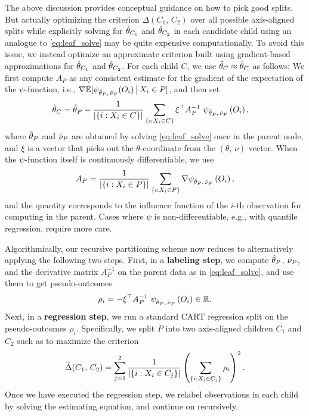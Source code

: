 \documentclass[aos]{imsart}
\theoremstyle{plain}
\theoremstyle{definition}
\theoremstyle{remark}
\begin{document}
\begin{CJK}{UTF8}{gbsn}
The above discussion provides conceptual guidance on how to pick
good splits. But actually optimizing the
criterion $\Delta(C_1, \, C_2)$ over all possible axis-aligned splits
while explicitly solving for $\hat{\theta}_{C_1}$ and $\hat{\theta}_{C_2}$ in each candidate child
using an analogue to \eqref{eq:leaf_solve} may be quite expensive computationally.
To avoid this issue, we instead optimize an approximate criterion 
built using gradient-based approximations for $\hat{\theta}_{C_1}$ and $\hat{\theta}_{C_2}$.
For each child $C$, we use $\tilde{\theta}_C \approx \hat{\theta}_C$ as follows:
We first compute $A_P$ as any consistent estimate for the gradient of the expectation of the $\psi$-function, i.e.,
$\nabla \mathbb{E}[\psi_{\hat{\theta}_P, \, \hat{\nu}_P}(O_i) \,\big|\, X_i \in P]$, and then set
\begin{align}
\label{eq:ttheta}
&\ttheta_C = \htheta_P - \frac{1}{\abs{\cb{i : X_i \in C}}} \sum_{\cb{i : X_i \in C}} \xi^\top A^{-1}_P \ \psi_{\htheta_P, \, \hnu_P}\p{O_i},
\end{align}
where $\hat{\theta}_P$ and $\hat{\nu}_P$ are obtained by solving \eqref{eq:leaf_solve} once in the parent node,
and $\xi$ is a vector that picks out the $\theta$-coordinate from the $(\theta, \, \nu)$ vector.
When the $\psi$-function itself is continuously differentiable, we use
\begin{equation}
\label{eq:AP}
A_P= \frac{1}{\abs{\cb{i : X_i \in P}}} \sum_{\cb{i : X_i \in P}} \nabla \psi_{\htheta_P, \, \hnu_P}\p{O_i},
\end{equation}
and the quantity  corresponds
to the influence function of the $i$-th observation for computing  in the parent.
Cases where $\psi$ is non-differentiable, e.g., with quantile regression, require more care.

Algorithmically, our recursive partitioning scheme now reduces to alternatively
applying the following two steps. First, in a {\bf labeling step}, we compute
$\hat{\theta}_P$, $\hat{\nu}_P$, and the derivative matrix $A_P^{-1}$ on the parent
data as in \eqref{eq:leaf_solve}, and use them to get pseudo-outcomes
\begin{equation}
\label{eq:relabel}
\rho_i = -\xi^\top A_P^{-1} \ \psi_{\htheta_P, \, \hnu_P}\p{O_i} \in \RR.
\end{equation}
Next, in a {\bf regression step}, we run a standard CART regression split on the pseudo-outcomes
$\rho_i$. Specifically, we split $P$ into two axis-aligned children $C_1$ and $C_2$
such as to maximize the criterion
\begin{equation}
\label{eq:gradient_criterion}
\tDelta(C_1, \, C_2) =  \sum_{j = 1}^2\frac{1}{\abs{\cb{i : X_i \in C_j}}}\p{ \sum_{\cb{i : X_i \in C_j}} \rho_i}^2.
\end{equation}
Once we have executed the regression step, we relabel observations in each child by solving the
estimating equation, and continue on recursively.


\end{CJK}
\end{document}
